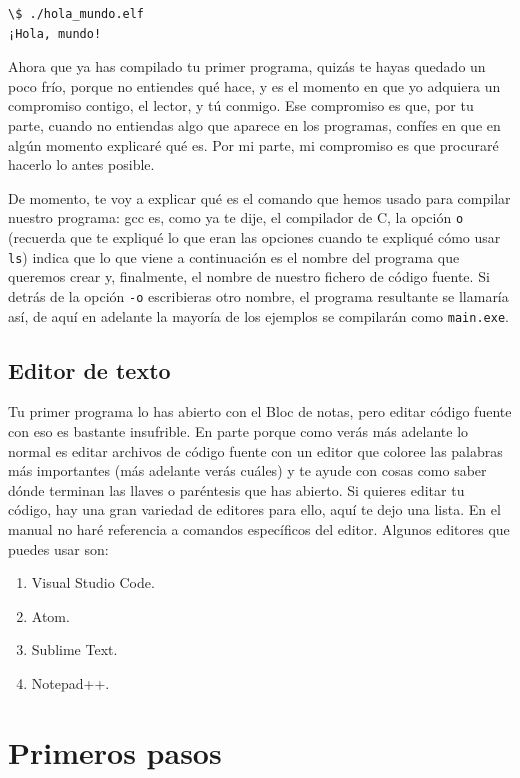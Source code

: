 \documentclass[a4paper]{article}
\begin{document}
\noindent
\begin{minipage}[H]{\linewidth}
\mbox{}
\begin{lstlisting}[style=terminalStyle]
\$ ./hola_mundo.elf
¡Hola, mundo!
\end{lstlisting}
\end{minipage}


Ahora que ya has compilado tu primer programa, quizás te hayas quedado un poco
frío, porque no entiendes qué hace, y es el momento en que yo adquiera un
compromiso contigo, el lector, y tú conmigo. Ese compromiso es que, por tu
parte, cuando no entiendas algo que aparece en los programas, confíes en que
en algún momento explicaré qué es. Por mi parte, mi compromiso es que procuraré
hacerlo lo antes posible.

De momento, te voy a explicar qué es el comando que hemos usado para compilar
nuestro programa: gcc es, como ya te dije, el compilador de C, la opción
\texttt{o} (recuerda que te expliqué lo que eran las opciones cuando te expliqué
cómo usar \verb!ls!) indica que lo que viene a continuación es el nombre del
programa que queremos crear y, finalmente, el nombre de nuestro fichero de
código fuente. Si detrás de la opción \verb!-o! escribieras otro nombre, el
programa resultante se llamaría así, de aquí en adelante la mayoría de los
ejemplos se compilarán como \verb!main.exe!.

\subsection{Editor de texto}
Tu primer programa lo has abierto con el Bloc de notas, pero editar código
fuente con eso es bastante insufrible. En parte porque como verás más adelante
lo normal es editar archivos de código fuente con un editor que coloree las
palabras más importantes (más adelante verás cuáles) y te ayude con cosas como
saber dónde terminan las llaves o paréntesis que has abierto. Si quieres
editar tu código, hay una gran variedad de editores para ello, aquí te dejo
una lista. En el manual no haré referencia a comandos específicos del editor.
Algunos editores que puedes usar son:
\begin{enumerate}
\item Visual Studio Code.
\item Atom.
\item Sublime Text.
\item Notepad++.
\end{enumerate}

\section{Primeros pasos}
\end{document}
